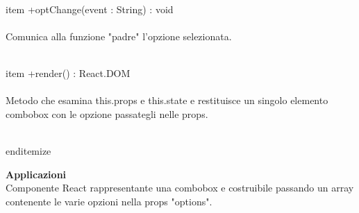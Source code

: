 \\item +optChange(event : String) : void  
\\\\
Comunica alla funzione "padre" l'opzione selezionata.

\\item +render() : React.DOM 
\\\\
Metodo che esamina this.props e this.state e restituisce un singolo elemento combobox con le opzione passategli nelle props.

\\end{itemize} 


\textbf{Applicazioni}\\
Componente React rappresentante una combobox e costruibile passando un array contenente le varie opzioni nella props "options". 


\clearpage

